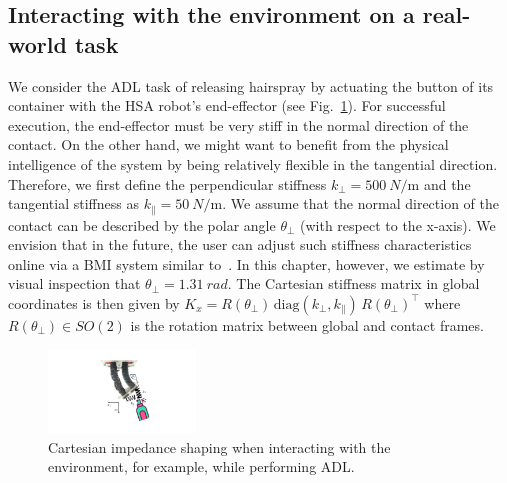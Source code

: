 \subsection{Interacting with the environment on a real-world task}\label{sub:braincontrol:experiments:adl}
We consider the \gls{ADL} task of releasing hairspray by actuating the button of its container with the \gls{HSA} robot's end-effector (see Fig.~\ref{fig:braincontrol:cartesian_impedance_adl}). For successful execution, the end-effector must be very stiff in the normal direction of the contact. On the other hand, we might want to benefit from the physical intelligence of the system by being relatively flexible in the tangential direction. Therefore, we first define the perpendicular stiffness $k_\perp = \SI{500}{N\per\meter}$ and the tangential stiffness as $k_\parallel = \SI{50}{N \per \meter}$. We assume that the normal direction of the contact can be described by the polar angle $\theta_\perp$ (with respect to the x-axis). We envision that in the future, the user can adjust such stiffness characteristics online via a \gls{BMI} system similar to~\citep{schiatti2017soft}. In this chapter, however, we estimate by visual inspection that $\theta_\perp=\SI{1.31}{rad}$.
The Cartesian stiffness matrix in global coordinates is then given by $K_x = R(\theta_\perp) \, \mathrm{diag}(k_\perp, k_\parallel) \, R(\theta_\perp)^\top$
where $R(\theta_\perp) \in SO(2)$ is the rotation matrix between global and contact frames.

\begin{figure}[hbt]
    \centering
    \includegraphics[width=0.35\textwidth]{braincontrol/figures/adl_task/cartesian_impedance_adl_cropped.pdf}
    \caption{Cartesian impedance shaping when interacting with the environment, for example, while performing \gls{ADL}. }
    \label{fig:braincontrol:cartesian_impedance_adl}
\end{figure}

